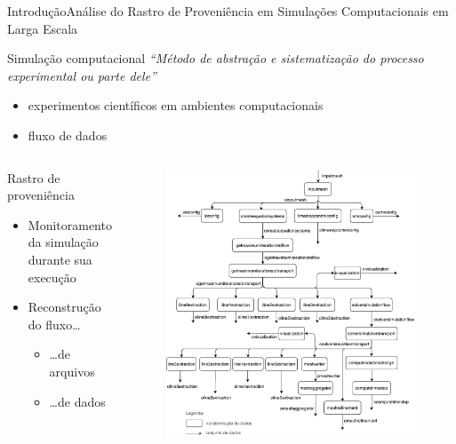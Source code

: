 \documentclass[12pt,compress]{beamer}
\newcommand{\nologo}{\setbeamertemplate{logo}{}} %
\begin{document}
{\nologo
\begin{frame}{Introdução}{Análise do \alert{Rastro de Proveniência} em \alert{Simulações Computacionais} em Larga Escala}

    \begin{alertblock}{Simulação computacional}
    \textit{``Método de abstração e sistematização do processo experimental ou parte dele''}
    \smallskip
    \begin{itemize}
        \item experimentos científicos em ambientes computacionais
        \item fluxo de dados
    \end{itemize}
    \end{alertblock}
    
    \begin{columns}
    \begin{block}{Rastro de proveniência}
    \begin{itemize}
        \item Monitoramento da simulação durante sua execução
        \item Reconstrução do fluxo\ldots{}
        \begin{itemize}
            \item \ldots{}de arquivos %
            \item \ldots{}de dados %
        \end{itemize}
    \end{itemize}
    \end{block}
    \begin{figure}
    \includegraphics[width=.9\textwidth]{img/experiments-dataflow.pdf}
    \end{figure}
    \end{columns}
    
\end{frame}
}
\end{document}
